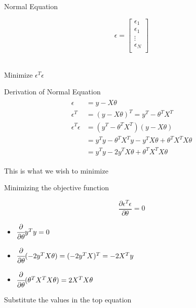\documentclass{beamer}
\begin{document}
\begin{frame}{Normal Equation}
    
\begin{equation*}
 \epsilon = 
\begin{bmatrix}
    \epsilon_{1} \\
    \epsilon_{1} \\
    \vdots \\
    \epsilon_{N} \\
\end{bmatrix}
\end{equation*}
\\
\begin{center}
    Minimize $\epsilon^{T}\epsilon$    
\end{center}
\end{frame}

\begin{frame}{Derivation of Normal Equation}
\begin{align}
\label{eqn*:eqlabel}
\begin{split}
   \epsilon &= y - X\theta \\
\epsilon^{T} &= (y-X\theta)^{T} = y^{T} - \theta^{T}X^{T}\\
\epsilon^{T}\epsilon &= (y^{T} - \theta^{T}X^{T})(y - X\theta)\\
&=y^{T}y - \theta^{T}X^{T}y - y^{T}X\theta+\theta^{T}X^{T}X\theta\\
&=y^{T}y - 2y^{T}X\theta+\theta^{T}X^{T}X\theta
\end{split}
\end{align}

This is what we wish to minimize
\end{frame}

\begin{frame}{Minimizing the objective function}
    
    
    \begin{equation}
        \frac{\partial \epsilon^{T} \epsilon}{\partial \theta} = 0    
    \end{equation}
    
    
    
    \begin{itemize}
        \item $
    \cfrac{\partial }{\partial \theta} y^{T}y= 0
    $
    \item $
    \cfrac{\partial }{\partial \theta}(-2y^{T}X\theta ) = (-2y^{T}X)^{T} = -2X^{T}y
    $
    \item $ \cfrac{\partial}{\partial\theta} (\theta^{T}X^{T}X\theta) = 2X^{T}X\theta$
    \end{itemize}
    
    Substitute the values in the top equation
    
\end{frame}
\end{document}
